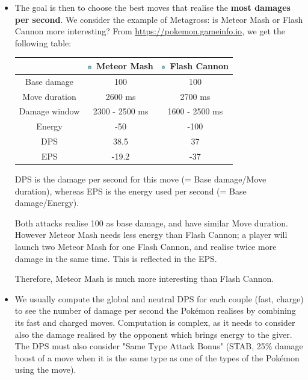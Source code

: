 \documentclass[8pt,aspectratio=169,compress]{beamer}
\newcommand{\steelsimp}{\includegraphics[height=0.15cm]{../../images/type/simplified/steel.png}}
\begin{document}
\begin{frame}
\begin{block}{}
\begin{tiny}
\begin{itemize}
  \item The goal is then to choose the best moves that realise the \textbf{most damages per second}. We consider the example of Metagross: is Meteor Mash or Flash Cannon more interesting? From \url{https://pokemon.gameinfo.io}, we get the following table:
  \begin{center}
\begin{tabular}{ccc}
& \steelsimp~Meteor Mash & \steelsimp~Flash Cannon \\ \hline
Base damage& 100 &100 \\
Move duration & 2600 ms & 2700 ms \\
Damage window &2300 - 2500 ms & 1600 - 2500 ms \\
Energy& -50 & -100  \\ \hline
DPS	& 38.5 & 37 \\
EPS & -19.2 &-37 \\
\end{tabular}
\end{center}

DPS is the damage per second for this move (= Base damage/Move duration), whereas EPS is the energy used per second (= Base damage/Energy).

Both attacks realise 100 as base damage, and have similar Move duration. However Meteor Mash needs less energy than Flash Cannon; a player will launch two Meteor Mash for one Flash Cannon, and realise twice more damage in the same time. This is reflected in the EPS.

Therefore, Meteor Mash is much more interesting than Flash Cannon.
\item We usually compute the global and neutral DPS for each couple (fast, charge) to see the number of damage per second the Pok\'emon realises by combining its fast and charged moves. Computation is complex, as it needs to consider also the damage realised by the opponent which brings energy to the giver. The DPS must also consider  "Same Type Attack Bonus" (STAB, 25\% damage boost of a move when it is the same type as one of the types of the Pokémon using the move). 

\begin{center}
   \href{https://pokemongo.gamepress.gg/tdo-how-calculate-pokemon-ability-outdated}{} \quad \quad 
   \href{https://pokemongo.gamepress.gg/comprehensive-dps-spreadsheet}{}
\end{center}


\end{itemize}
\end{tiny}
\end{block}
\end{frame}
\end{document}
